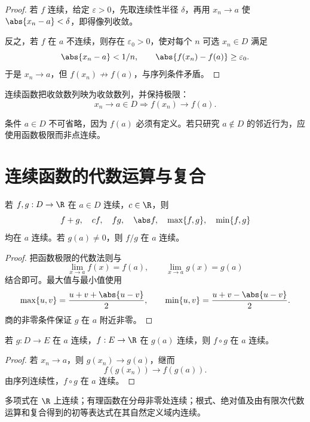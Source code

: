 \begin{proof}
若 \(f\) 连续，给定 \(\varepsilon>0\)，先取连续性半径 \(\delta\)，再用 \(x_n\to a\) 使 \(\abs{x_n-a}<\delta\)，即得像列收敛。

反之，若 \(f\) 在 \(a\) 不连续，则存在 \(\varepsilon_0>0\)，使对每个 \(n\) 可选 \(x_n\in D\) 满足
\[
 \abs{x_n-a}<1/n,\qquad
 \abs{f(x_n)-f(a)}\ge\varepsilon_0.
\]
于是 \(x_n\to a\)，但 \(f(x_n)\not\to f(a)\)，与序列条件矛盾。
\end{proof}

\begin{corollary}
连续函数把收敛数列映为收敛数列，并保持极限：
\[
 x_n\to a\in D\Longrightarrow f(x_n)\to f(a).
\]
\end{corollary}

条件 \(a\in D\) 不可省略，因为 \(f(a)\) 必须有定义。若只研究 \(a\notin D\) 的邻近行为，应使用函数极限而非点连续。

\section{连续函数的代数运算与复合}

\begin{theorem}
若 \(f,g:D\to\R\) 在 \(a\in D\) 连续，\(c\in\R\)，则
\[
 f+g,\quad cf,\quad fg,\quad\abs f,\quad
 \max\{f,g\},\quad\min\{f,g\}
\]
均在 \(a\) 连续。若 \(g(a)\ne0\)，则 \(f/g\) 在 \(a\) 连续。
\end{theorem}

\begin{proof}
把函数极限的代数法则与
\[
 \lim_{x\to a}f(x)=f(a),\qquad
 \lim_{x\to a}g(x)=g(a)
\]
结合即可。最大值与最小值使用
\[
 \max\{u,v\}=\frac{u+v+\abs{u-v}}2,\qquad
 \min\{u,v\}=\frac{u+v-\abs{u-v}}2.
\]
商的非零条件保证 \(g\) 在 \(a\) 附近非零。
\end{proof}

\begin{theorem}[复合连续性]
若 \(g:D\to E\) 在 \(a\) 连续，\(f:E\to\R\) 在 \(g(a)\) 连续，则 \(f\circ g\) 在 \(a\) 连续。
\end{theorem}

\begin{proof}
若 \(x_n\to a\)，则 \(g(x_n)\to g(a)\)，继而
\[
 f(g(x_n))\to f(g(a)).
\]
由序列连续性，\(f\circ g\) 在 \(a\) 连续。
\end{proof}

\begin{corollary}
多项式在 \(\R\) 上连续；有理函数在分母非零处连续；根式、绝对值及由有限次代数运算和复合得到的初等表达式在其自然定义域内连续。
\end{corollary}

